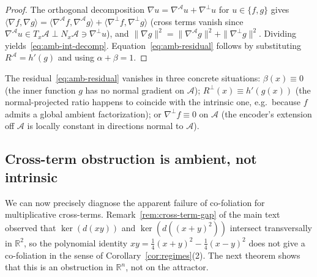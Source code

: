 \documentclass{article}
\begin{document}
\begin{proof}
The orthogonal decomposition $\nabla u = \nabla^{\!\mathcal{A}} u +
\nabla^{\!\perp} u$ for $u\in\{f,g\}$ gives
$\langle\nabla f, \nabla g\rangle = \langle\nabla^{\!\mathcal{A}} f,
\nabla^{\!\mathcal{A}} g\rangle + \langle\nabla^{\!\perp} f, \nabla^{\!\perp} g\rangle$
(cross terms vanish since
$\nabla^{\!\mathcal{A}} u\in T_x\mathcal{A}\perp N_x\mathcal{A}\ni\nabla^{\!\perp} u$),
and $\|\nabla g\|^2 = \|\nabla^{\!\mathcal{A}} g\|^2+\|\nabla^{\!\perp} g\|^2$.
Dividing yields~\eqref{eq:amb-int-decomp}. Equation~\eqref{eq:amb-residual}
follows by substituting $R^{\!\mathcal{A}} = h'(g)$ and using
$\alpha + \beta = 1$.
\end{proof}

The residual~\eqref{eq:amb-residual} vanishes in three concrete situations:
$\beta(x) \equiv 0$ (the inner function $g$ has no normal gradient on
$\mathcal{A}$); $R^{\!\perp}(x) \equiv h'(g(x))$ (the normal-projected
ratio happens to coincide with the intrinsic one, e.g.\ because $f$ admits
a global ambient factorization); or $\nabla^{\!\perp} f \equiv 0$ on
$\mathcal{A}$ (the encoder's extension off $\mathcal{A}$ is locally
constant in directions normal to $\mathcal{A}$).

\subsection{Cross-term obstruction is ambient, not intrinsic}

We can now precisely diagnose the apparent failure of co-foliation for
multiplicative cross-terms. Remark~\ref{rem:cross-term-gap} of the main text observed
that $\ker(d(xy))$ and $\ker(d((x+y)^2))$ intersect transversally in
$\mathbb{R}^2$, so the polynomial identity
$xy = \tfrac14(x+y)^2 - \tfrac14(x-y)^2$ does not give a co-foliation
in the sense of Corollary~\ref{cor:regimes}(2). The next theorem shows that
this is an obstruction in $\mathbb{R}^n$, not on the attractor.
\end{document}
